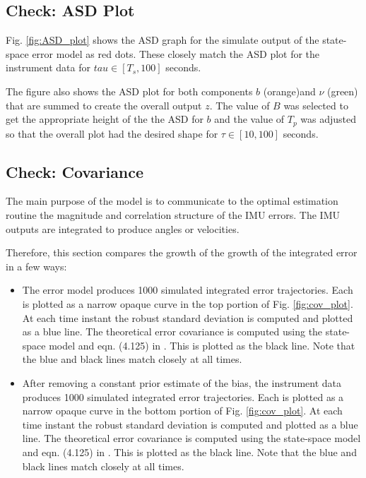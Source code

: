 \documentclass[letter,twocolumn]{article}
\begin{document}
\subsection{Check: ASD Plot}
Fig. \ref{fig:ASD_plot} shows the ASD graph for the simulate output of the state-space error model as red dots. These closely match the ASD plot for the instrument data for $tau\in[T_s,100]$ seconds. 

The figure also shows the ASD plot for both components $b$ (orange)and $\nu$ (green) that are summed to create the overall output $z$. The value of $B$ was selected to get the appropriate height of the the ASD for $b$ and the value of $T_p$ was adjusted so that the overall plot had the desired shape for $\tau\in[10,100]$ seconds.

\subsection{Check: Covariance}
The main purpose of the model is to communicate to the optimal estimation routine the magnitude and correlation structure of the IMU errors. The IMU outputs are integrated to produce angles or velocities. 

Therefore, this section compares the growth of the growth of the integrated error in a few ways:
\begin{itemize}
	\item The error model produces 1000 simulated integrated error trajectories. 
	Each is plotted as a narrow opaque curve in the top portion of Fig. \ref{fig:cov_plot}. 
	At each time instant the robust standard deviation is computed and plotted as a blue line.
	The theoretical error covariance is computed using the state-space model and eqn. (4.125) in \cite{farrell2008aided}. 
	This is plotted as the black line. 
	Note that the blue and black lines match closely at all times.
	\item 	After removing a constant prior estimate of the bias, the instrument data produces 1000 simulated integrated error trajectories. 
	Each is plotted as a narrow opaque curve in the bottom portion of Fig. \ref{fig:cov_plot}. 
	At each time instant the robust standard deviation is computed and plotted as a blue line.
	The theoretical error covariance is computed using the state-space model and eqn. (4.125) in \cite{farrell2008aided}. 
	This is plotted as the black line. 
	Note that the blue and black lines match closely at all times.
\end{itemize}




\end{document}
